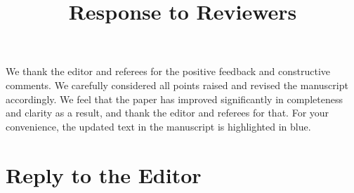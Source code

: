 \documentclass[11pt, a4paper]{article}
\title{\textbf{Response to Reviewers}}
\date{}
\begin{document}
\maketitle

\noindent We thank the editor and referees for the positive feedback and constructive comments. We carefully considered all points raised and revised the manuscript accordingly. We feel that the paper has improved significantly in completeness and clarity as a result, and thank the editor and referees for that.
For your convenience, the updated text in the manuscript is highlighted in blue. 


\section*{Reply to the Editor}
\end{document}
